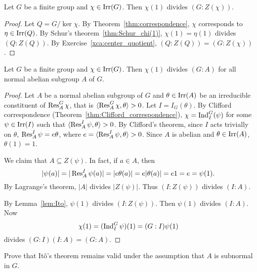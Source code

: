 \begin{lemma}
\label{lem:Ito}
    Let $G$ be a finite group and 
    $\chi\in\operatorname{Irr}(G)$. Then $\chi(1)$ divides $(G:Z(\chi))$. 
\end{lemma}

\begin{proof}
    Let $Q=G/\ker\chi$. 
    By Theorem~\ref{thm:correspondence}, $\chi$ corresponds to 
    $\eta\in\operatorname{Irr}(Q)$. 
    By Schur's theorem~\ref{thm:Schur_chi(1)}, 
    $\chi(1)=\eta(1)$ divides $(Q:Z(Q))$. By Exercise~\ref{xca:center_quotient}, 
    $(Q:Z(Q))=(G:Z(\chi))$.    
\end{proof}

\begin{theorem}[It\^o]
\label{thm:Ito}
Let $G$ be a finite group and $\chi\in\operatorname{Irr}(G)$. Then 
$\chi(1)$ divides $(G:A)$ for all normal abelian subgroup $A$ of $G$.  
\end{theorem}

\begin{proof}
    Let $A$ be a normal abelian subgroup of $G$ and 
    $\theta\in\operatorname{Irr}(A)$ be an irreducible constituent of $\operatorname{Res}_A^G\chi$, that 
    is $\langle\operatorname{Res}_A^G\chi,\theta\rangle>0$. Let $I=I_G(\theta)$. 
    By Clifford correspondence (Theorem~\ref{thm:Clifford_correspondence}), 
    $\chi=\operatorname{Ind}_I^G(\psi)$ for some $\psi\in\operatorname{Irr}(I)$ such that 
    $\langle\operatorname{Res}_A^I\psi,\theta\rangle>0$. By Clifford's theorem, since 
    $I$ acts trivially on $\theta$, 
    $\operatorname{Res}_A^I\psi=e\theta$, where $e=\langle\operatorname{Res}_A^I\psi,\theta\rangle>0$. Since $A$ is abelian and
    $\theta\in\operatorname{Irr}(A)$, $\theta(1)=1$. 
    
    We claim that $A\subseteq Z(\psi)$. In fact, if $a\in A$, then 
    \[
    |\psi(a)|=|\operatorname{Res}_A^I\psi(a)|=|e\theta(a)|=e|\theta(a)|=e1=e=\psi(1).
    \]
    By Lagrange's theorem, $|A|$ divides $|Z(\psi)|$. Thus $(I:Z(\psi))$ divides $(I:A)$. 

    By Lemma~\ref{lem:Ito}, 
    $\psi(1)$ divides $(I:Z(\psi))$. Then 
    $\psi(1)$ divides $(I:A)$. Now 
    \[
    \chi(1)=(\operatorname{Ind}_I^G\psi)(1)=(G:I)\psi(1)
    \]
    divides $(G:I)(I:A)=(G:A)$.
\end{proof}

\begin{bonus}
    \label{xca:Reynolds}
	Prove that Itô’s theorem remains valid under the assumption that $A$ is subnormal in $G$.
\end{bonus}



